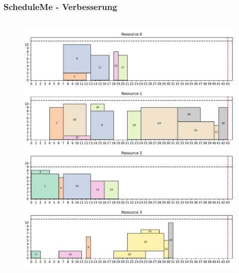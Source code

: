 \documentclass[aspectratio=169]{beamer}
\begin{document}
\begin{frame}
	\frametitle{ScheduleMe - Verbesserung}

	\vspace{-6pt}


	\vspace{-10pt}
	\begin{columns}[c] %


		\vspace{-10pt}

		\begin{figure}
			\centering
			\includegraphics[scale=0.25]{example_plot_init.pdf}
		\end{figure}	
			

		\vspace{-10pt}


\end{columns}
\end{frame}
\end{document}
